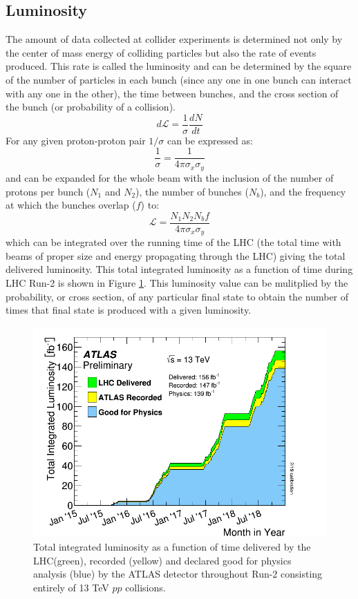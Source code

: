 \subsection{Luminosity}
The amount of data collected at collider experiments is determined not only by the center of mass energy of colliding particles but also the rate of events produced.  This rate is called the luminosity and can be determined by the square of the number of particles in each bunch (since any one in one bunch can interact with any one in the other), the time between bunches, and the cross section of the bunch (or probability of a collision).
\[ d\mathcal{L}=\frac{1}{\sigma}\frac{dN}{dt} \]
For any given proton-proton pair $1/\sigma$ can be expressed as:
\[ \frac{1}{\sigma}=\frac{1}{4\pi \sigma_x \sigma_y} \]
and can be expanded for the whole beam with the inclusion of the number of protons per bunch ($N_1$ and $N_2$), the number of bunches ($N_b$), and the frequency at which the bunches overlap ($f$) to:
\[ \mathcal{L}=\frac{N_1 N_2 N_b f}{4 \pi \sigma_x \sigma_y} \]
which can be integrated over the running time of the LHC (the total time with beams of proper size and energy propagating through the LHC) giving the total delivered luminosity.  This total integrated luminosity as a function of time during LHC Run-2 is shown in Figure \ref{fig:ATLASLumi}.  This luminosity value can be mulitplied by the probability, or cross section, of any particular final state to obtain the number of times that final state is produced with a given luminosity.
\begin{figure}[ht!]
	\centering
	\includegraphics[width=.7\columnwidth]{../ThesisImages/LHCImages/ATLASLumi.png}
	\caption[Total integrated luminosity as a function of time delivered by the LHC(green), recorded (yellow) and declared good for physics analysis (blue) by the ATLAS detector throughout Run-2 consisting entirely of 13 TeV $pp$ collisions.]{Total integrated luminosity as a function of time delivered by the LHC(green), recorded (yellow) and declared good for physics analysis (blue) by the ATLAS detector throughout Run-2 consisting entirely of 13 TeV $pp$ collisions\cite{ATLASLumi}.}
	\label{fig:ATLASLumi}
\end{figure}


